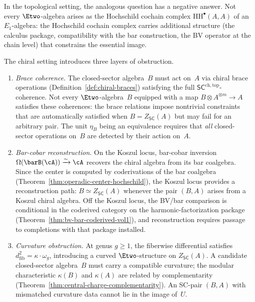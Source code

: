 In the topological setting, the analogous question has a
negative answer. Not every $\Etwo$-algebra arises as the
Hochschild cochain complex $\mathrm{HH}^\bullet(A, A)$ of an
$E_1$-algebra: the Hochschild cochain complex carries
additional structure (the calculus package, compatibility with
the bar construction, the BV operator at the chain level)
that constrains the essential image.

The chiral setting introduces three layers of obstruction.

\begin{enumerate}[label=\textup{(\roman*)}]
\item \emph{Brace coherence.}
 The closed-sector algebra~$B$ must act on~$A$ via chiral
 brace operations
 (Definition~\ref{def:chiral-braces}) satisfying the full
 $\mathsf{SC}^{\mathrm{ch,top}}$-coherence. Not every
 $\Etwo$-algebra~$B$ equipped with a map $B \otimes A^{\otimes m}
 \to A$ satisfies these coherences: the brace relations impose
 nontrivial constraints that are automatically satisfied when
 $B = Z_{\mathsf{SC}}(A)$ but may fail for an arbitrary pair.
 The unit $\eta_B$ being an equivalence requires that
 \emph{all} closed-sector operations on~$B$ are detected by
 their action on~$A$.

\item \emph{Bar-cobar reconstruction.}
 On the Koszul locus, bar-cobar inversion
 $\Omega(\barB(\cA)) \xrightarrow{\sim} \cA$ recovers the
 chiral algebra from its bar coalgebra. Since the center is
 computed by coderivations of the bar coalgebra
 (Theorem~\ref{thm:operadic-center-hochschild}), the Koszul
 locus provides a reconstruction path:
 $B \simeq Z_{\mathsf{SC}}(A)$ whenever the pair $(B, A)$
 arises from a Koszul chiral algebra. Off the Koszul locus,
 the BV/bar comparison is conditional in the coderived category on the
 harmonic-factorization package
 (Theorem~\ref{thm:bv-bar-coderived-vol1}), and reconstruction
 requires passage to completions with that package installed.

\item \emph{Curvature obstruction.}
 At genus $g \geq 1$, the fiberwise differential satisfies
 $d^2_{\mathrm{fib}} = \kappa \cdot \omega_g$, introducing a
 curved $\Etwo$-structure on $Z_{\mathsf{SC}}(A)$. A
 candidate closed-sector algebra~$B$ must carry a compatible
 curvature; the modular characteristic $\kappa(B)$ and
 $\kappa(A)$ are related by complementarity
 (Theorem~\ref{thm:central-charge-complementarity}). An SC-pair
 $(B, A)$ with mismatched curvature data cannot lie in the
 image of~$U$.
\end{enumerate}

